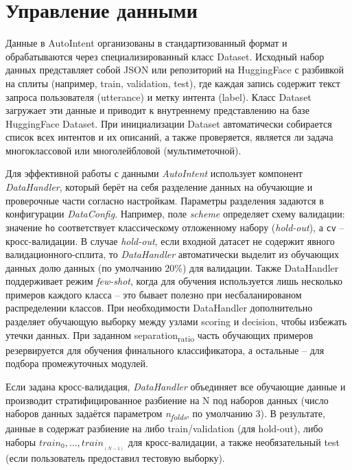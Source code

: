 \documentclass[14pt,a4paper,oneside,openany]{extbook}
\begin{document}
\section{Управление данными}
\label{sec:org14b5939}
Данные в AutoIntent организованы в стандартизованный формат и обрабатываются через специализированный класс Dataset. Исходный набор данных представляет собой JSON или репозиторий на HuggingFace с разбивкой на сплиты (например, train, validation, test), где каждая запись содержит текст запроса пользователя (utterance) и метку интента (label). Класс Dataset загружает эти данные и приводит к внутреннему представлению на базе HuggingFace Dataset. При инициализации Dataset автоматически собирается список всех интентов и их описаний, а также проверяется, является ли задача многоклассовой или многолейбловой (мультиметочной).

Для эффективной работы с данными \emph{AutoIntent} использует компонент \emph{DataHandler}, который берёт на себя разделение данных на обучающие и проверочные части согласно настройкам. Параметры разделения задаются в конфигурации \emph{DataConfig}. Например, поле \emph{scheme} определяет схему валидации: значение \texttt{ho} соответствует классическому отложенному набору (\emph{hold-out}), а \texttt{cv} – кросс-валидации. В случае \emph{hold-out}, если входной датасет не содержит явного валидационного-сплита, то \emph{DataHandler} автоматически выделит из обучающих данных долю данных (по умолчанию 20\%) для валидации. Также DataHandler поддерживает режим \emph{few-shot}, когда для обучения используется лишь несколько примеров каждого класса – это бывает полезно при несбаланированом распределении классов. При необходимости DataHandler дополнительно разделяет обучающую выборку между узлами scoring и decision, чтобы избежать утечки данных. При заданном separation\textsubscript{ratio} часть обучающих примеров резервируется для обучения финального классификатора, а остальные – для подбора промежуточных модулей.

Если задана кросс-валидация, \emph{DataHandler} объединяет все обучающие данные и производит стратифицированное разбиение на N под наборов данных (число наборов данных задаётся параметром \emph{n\textsubscript{folds}}, по умолчанию 3). В результате, данные в содержат разбиение на либо train/validation (для hold-out), либо наборы \(train_0, \dots, train_{_(N-1)}\) для кросс-валидации, а также необязательный test (если пользователь предоставил тестовую выборку).
\end{document}
